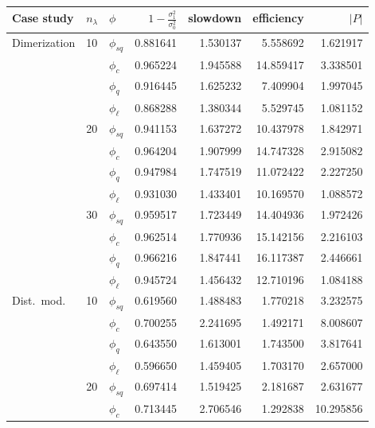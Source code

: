 \begin{table}[]
    \centering
\begin{tabular}{l@{\hskip 12pt}l@{\hskip 12pt}l@{\hskip 12pt}r@{\hskip 12pt}r@{\hskip 12pt}r@{\hskip 12pt}r}
\toprule
  Case study &   $n_{\lambda}$ & $\phi$ & $1-\frac{\sigma_1^2}{\sigma_0^2}$ &  slowdown &  efficiency& $\lvert P\rvert$ \\\midrule
Dimerization & 10 &$\phi_{sq}$ &  0.881641 &  1.530137 &    5.558692 &   1.621917 \\
            &    &$\phi_{c}$ &  0.965224 &  1.945588 &   14.859417 &   3.338501 \\
            &    &$\phi_{q}$ &  0.916445 &  1.625232 &    7.409904 &   1.997045 \\
            &    & $\phi_{\ell}$ &  0.868288 &  1.380344 &    5.529745 &   1.081152 \\\cmidrule{2-7}
            & 20 &$\phi_{sq}$ &  0.941153 &  1.637272 &   10.437978 &   1.842971 \\
            &    &$\phi_{c}$ &  0.964204 &  1.907999 &   14.747328 &   2.915082 \\
            &    &$\phi_{q}$ &  0.947984 &  1.747519 &   11.072422 &   2.227250 \\
            &    & $\phi_{\ell}$ &  0.931030 &  1.433401 &   10.169570 &   1.088572 \\\cmidrule{2-7}
            & 30 &$\phi_{sq}$ &  0.959517 &  1.723449 &   14.404936 &   1.972426 \\
            &    &$\phi_{c}$ &  0.962514 &  1.770936 &   15.142156 &   2.216103 \\
            &    &$\phi_{q}$ &  0.966216 &  1.847441 &   16.117387 &   2.446661 \\
            &    & $\phi_{\ell}$ &  0.945724 &  1.456432 &   12.710196 &   1.084188 \\\midrule
Dist.\ mod. & 10 &$\phi_{sq}$ &  0.619560 &  1.488483 &    1.770218 &   3.232575 \\
            &    &$\phi_{c}$ &  0.700255 &  2.241695 &    1.492171 &   8.008607 \\
            &    &$\phi_{q}$ &  0.643550 &  1.613001 &    1.743500 &   3.817641 \\
            &    & $\phi_{\ell}$ &  0.596650 &  1.459405 &    1.703170 &   2.657000 \\\cmidrule{2-7}
            & 20 &$\phi_{sq}$ &  0.697414 &  1.519425 &    2.181687 &   2.631677 \\
            &    &$\phi_{c}$ &  0.713445 &  2.706546 &    1.292838 &  10.295856 \\

\end{tabular}
\end{table}
